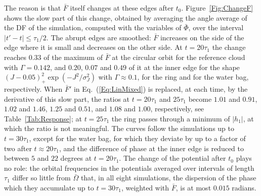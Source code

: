 The reason is that $\bar{F}$ itself changes at these edges after $t_0$. Figure~\ref{Fig:ChangeF} shows the slow part of this change, obtained by averaging the angle average of the DF of the simulation, computed with the variables of $\bar{\Phi}$, over the interval $|t' - t|\leq\tau_1/2$. The abrupt edges are smoothed: $\bar{F}$ increases on the side of the edge where it is small and decreases on the other side. At $t = 20\tau_1$ the change reaches $0.33$ of the maximum of $\bar{F}$ at the circular orbit for the reference cloud with $\Gamma = 0.142$, and $0.20$, $0.07$ and $0.49$ of it at the inner edge for the shape $(J - 0.05)_+^2\exp(-J^2/\sigma_J^2)$ with $\Gamma\approx 0.1$, for the ring and for the water bag, respectively. When $\bar{F}'$ in Eq.~(\ref{Eq:LinMixed}) is replaced, at each time, by the derivative of this slow part, the ratios at $t = 20\tau_1$ and $25\tau_1$ become $1.01$ and $0.91$, $1.02$ and $1.46$, $1.25$ and $0.51$, and $1.08$ and $1.00$, respectively, see Table~\ref{Tab:Response}; at $t = 25\tau_1$ the ring passes through a minimum of $|h_1|$, at which the ratio is not meaningful. The curves follow the simulations up to $t = 30\tau_1$, except for the water bag, for which they deviate by up to a factor of two after $t\approx 20\tau_1$, and the difference of phase at the inner edge is reduced to between $5$ and $22$ degrees at $t = 20\tau_1$. The change of the potential after $t_0$ plays no role: the orbital frequencies in the potentials averaged over intervals of length $\tau_1$ differ so little from $\bar{\Omega}$ that, in all eight simulations, the dispersion of the phase which they accumulate up to $t = 30\tau_1$, weighted with $\bar{F}$, is at most $0.015$ radians.

